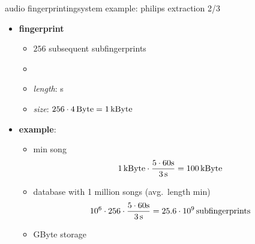         \begin{frame}{audio fingerprinting}{system example: philips extraction 2/3}
            \begin{itemize}
                \item[] \textbf{fingerprint}
                    \begin{itemize}
                        \item	$256$ subsequent subfingerprints
                        \item<2->[$\Rightarrow$]
                        \item<2->	\textit{length}: \unit[3]{s}
                        \item<2->	\textit{size}: $256\cdot \unit[4]{Byte} = \unit[1]{kByte}$
                    \end{itemize}
                \smallskip
                \item<3->[]   \textbf{example}:
                    \begin{itemize}
                        \item   \unit[5]{min} song
                        \begin{equation*}
                            \unit[1]{kByte} \cdot \frac{5\cdot 60 \unit{s}}{\unit[3]{s}} = \unit[100]{kByte}
                        \end{equation*}
                    \end{itemize}
                    
                    \begin{itemize}
                        \item<4->   database with 1 million songs (avg.\ length \unit[5]{min})
                        \begin{equation*}
                            10^6\cdot 256\cdot\frac{5\cdot 60 \unit{s}}{\unit[3]{s}} = \unit[25.6\cdot 10^9]{subfingerprints}
                        \end{equation*}
                        \item<4->[$\Rightarrow$] \unit[100]{GByte} storage
                    \end{itemize}
            \end{itemize}
        \end{frame}
        
